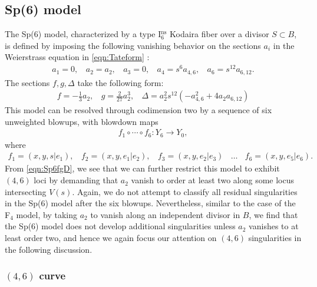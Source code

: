\documentclass[11pt,oneside,english]{article}
\numberwithin{equation}{section}
\theoremstyle{definition}
\begin{document}
\subsection{Sp(6) model}

The Sp(6) model, characterized by a type I$_{6}^{\text{ns}}$ Kodaira fiber over a divisor $S \subset B$, is defined by imposing the following vanishing behavior on the sections $a_i$ in the Weierstrass equation in \cref{eqn:Tateform} \cite{Esole:2017kyr}:
	\begin{align}
		a_1 = 0,~~~~ a_2 = a_2,~~~~ a_3 =0,~~~~ a_4 = s^6 a_{4,6},~~~~ a_6 = s^{12} a_{6,12}.
	\end{align}
The sections $f,g, \Delta$ take the following form:
	\begin{align}
	\label{eqn:Sp6fgD}
		 f = - \frac{1}{3} a_2,~~~~ g= \frac{2}{27} a_2^3,~~~~ \Delta = a_2^2 s^{12} ( -a_{4,6}^2 + 4 a_2 a_{6,12} )
	\end{align}
This model can be resolved through codimension two by a sequence of six unweighted blowups, with blowdown maps 
	\begin{align}
		f_1 \circ \cdots \circ f_6 : Y_6 \rightarrow Y_0,
	\end{align}
	 where 
	\begin{align}
	\label{eqn:Sp6sixblowups}
		f_1= (x,y,s|e_1),~~~~f_2 = (x,y,e_1|e_2), ~~~~ f_3 = (x,y,e_2|e_3)  ~~~~\dots~~~~f_6 = (x,y,e_5|e_6). 
	\end{align}
From \cref{eqn:Sp6fgD}, we see that we can further restrict this model to exhibit $(4,6)$ loci by demanding that $a_2$ vanish to order at least two along some locus intersecting $V(s)$.
Again, we do not attempt to classify all residual singularities in the Sp(6) model after the six blowups. Nevertheless, similar to the case of the F$_4$ model, by taking $a_2$ to vanish along an independent divisor in $B$, we find that the Sp(6) model does not develop additional singularities unless $a_2$ vanishes to at least order two, and hence we again focus our attention on $(4,6)$ singularities in the following discussion.

	\subsubsection{$(4,6)$ curve}
	
\end{document}
